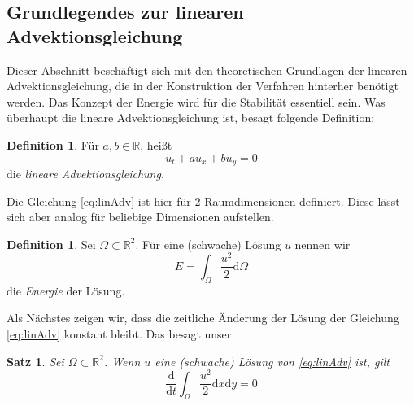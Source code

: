 \documentclass[12pt,a4paper]{scrartcl}
\numberwithin{equation}{section} %
\theoremstyle{definition}
\newtheorem{defn}[auf]{Definition}
\theoremstyle{plain}
\newtheorem{sa}[auf]{Satz}
\newcommand{\rr}{\mathbb{R}}
\newcommand{\de}{\mathrm{d}}
\begin{document}
\subsection{Grundlegendes zur linearen Advektionsgleichung}
Dieser Abschnitt beschäftigt sich mit den theoretischen Grundlagen der linearen Advektionsgleichung, die in der Konstruktion der Verfahren hinterher benötigt werden. Das Konzept der Energie wird für die Stabilität essentiell sein. Was überhaupt die lineare Advektionsgleichung ist, besagt folgende Definition:
\begin{defn}
Für $a,b\in\rr$, heißt
\begin{equation}
u_t+au_x+bu_y=0
\label{eq:linAdv}
\end{equation}
die \emph{lineare Advektionsgleichung}.
\end{defn}
Die Gleichung \eqref{eq:linAdv} ist hier für 2 Raumdimensionen definiert. Diese lässt sich aber analog für beliebige Dimensionen aufstellen. 
\begin{defn}
Sei $\Omega\subset\rr^2$. Für eine (schwache) Lösung $u$  nennen wir
\begin{equation}
E=\int_\Omega\frac{u^2}{2}\de\Omega
\label{eq:Energie}
\end{equation}
die \emph{Energie} der Lösung.
\end{defn}
Als Nächstes zeigen wir, dass die zeitliche Änderung der Lösung der Gleichung \eqref{eq:linAdv} konstant bleibt. Das besagt unser
\begin{sa}
Sei $\Omega\subset\rr^2$. Wenn $u$ eine (schwache) Lösung von \eqref{eq:linAdv} ist, gilt 
\begin{equation}
\label{eq:Enaen}
\frac{\de}{\de t}\int_{\Omega}\frac{u^2}{2}\de x\de y =0
\end{equation}
\end{sa} 
\end{document}
